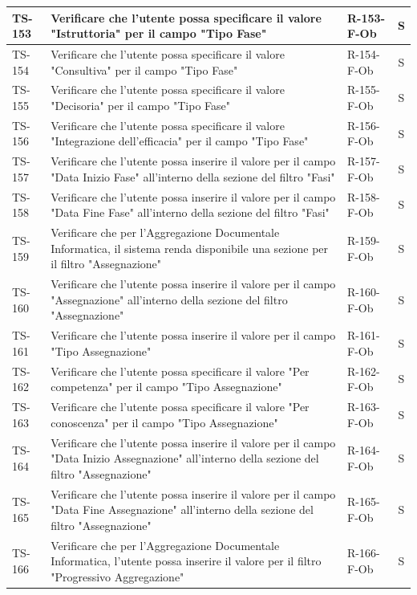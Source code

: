 \documentclass[a4paper,12pt]{article}
\begin{document}
\begin{longtable}{|p{1.5cm}|p{8.3cm}|p{2.4cm}|c|}
\hline
TS-153 & Verificare che l'utente possa specificare il valore "Istruttoria" per il campo "Tipo Fase" & R-153-F-Ob & S \\
\hline
TS-154 & Verificare che l'utente possa specificare il valore "Consultiva" per il campo "Tipo Fase" & R-154-F-Ob & S \\
\hline
TS-155 & Verificare che l'utente possa specificare il valore "Decisoria" per il campo "Tipo Fase" & R-155-F-Ob & S \\
\hline
TS-156 & Verificare che l'utente possa specificare il valore "Integrazione dell'efficacia" per il campo "Tipo Fase" & R-156-F-Ob & S \\
\hline
TS-157 & Verificare che l'utente possa inserire il valore per il campo "Data Inizio Fase" all'interno della sezione del filtro "Fasi" & R-157-F-Ob & S \\
\hline
TS-158 & Verificare che l'utente possa inserire il valore per il campo "Data Fine Fase" all'interno della sezione del filtro "Fasi" & R-158-F-Ob & S \\
\hline
TS-159 & Verificare che per l'Aggregazione Documentale Informatica, il sistema renda disponibile una sezione per il filtro "Assegnazione" & R-159-F-Ob & S \\
\hline
TS-160 & Verificare che l'utente possa inserire il valore per il campo "Assegnazione" all'interno della sezione del filtro "Assegnazione" & R-160-F-Ob & S \\
\hline
TS-161 & Verificare che l'utente possa inserire il valore per il campo "Tipo Assegnazione" & R-161-F-Ob & S \\
\hline
TS-162 & Verificare che l'utente possa specificare il valore "Per competenza" per il campo "Tipo Assegnazione" & R-162-F-Ob & S \\
\hline
TS-163 & Verificare che l'utente possa specificare il valore "Per conoscenza" per il campo "Tipo Assegnazione" & R-163-F-Ob & S \\
\hline
TS-164 & Verificare che l'utente possa inserire il valore per il campo "Data Inizio Assegnazione" all'interno della sezione del filtro "Assegnazione" & R-164-F-Ob & S \\
\hline
TS-165 & Verificare che l'utente possa inserire il valore per il campo "Data Fine Assegnazione" all'interno della sezione del filtro "Assegnazione" & R-165-F-Ob & S \\
\hline
TS-166 & Verificare che per l'Aggregazione Documentale Informatica, l'utente possa inserire il valore per il filtro "Progressivo Aggregazione" & R-166-F-Ob & S \\

\end{longtable}
\end{document}
